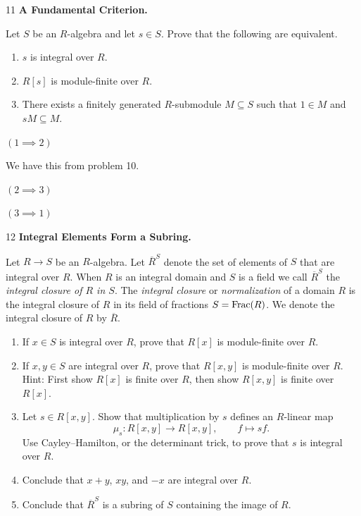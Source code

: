 \documentclass[Notebook.tex]{subfiles}
\begin{document}
\newpage 

\begin{problem}{11}
    \textbf{A Fundamental Criterion.} 
    
    Let $S$ be an $R$-algebra and let $s\in S$. Prove that the following are equivalent.
    \begin{enumerate}
        \item $s$ is integral over $R$.
        \item $R[s]$ is module-finite over $R$.
        \item There exists a finitely generated $R$-submodule $M\subseteq S$ such that $1\in M$ and $sM\subseteq M$.
    \end{enumerate}
\end{problem}

\begin{solution}
    \bbni

    $(1 \implies 2)$ 

    We have this from problem 10. 
    
    $(2 \implies 3)$ 
    
    \todo{}

    $(3 \implies 1)$
\end{solution}

\begin{problem}{12}
    \textbf{Integral Elements Form a Subring.} 
    
    Let $R \to S$ be an $R$-algebra. Let $\overline{R}^{S}$ denote the set of elements of $S$ that are integral over $R$. When $R$ is an integral domain and $S$ is a field we call $\overline{R}^{S}$ the \emph{integral closure of $R$ in $S$}. The \emph{integral closure} or \emph{normalization} of a domain $R$ is the integral closure of $R$ in its field of fractions $S=\text{Frac}(R)$. We denote the integral closure of $R$ by $\overline{R}$. 
    \begin{enumerate}
        \item If $x\in S$ is integral over $R$, prove that $R[x]$ is module-finite over $R$.

        \item If $x,y\in S$ are integral over $R$, prove that $R[x,y]$ is module-finite over $R$. Hint: First show $R[x]$ is finite over $R$, then show $R[x,y]$ is finite over $R[x]$.

        \item Let $s\in R[x,y]$. Show that multiplication by $s$ defines an
        $R$-linear map
        \[
        \mu_s:R[x,y]\longrightarrow R[x,y],
        \qquad
        f \longmapsto sf.
        \]
        Use Cayley--Hamilton, or the determinant trick, to prove that $s$ is
        integral over $R$.

        \item Conclude that $x+y$, $xy$, and $-x$ are integral over $R$.

        \item Conclude that $\overline{R}^{S}$ is a subring of $S$ containing the image of $R$.


    \end{enumerate}    
\end{problem}
\end{document}
